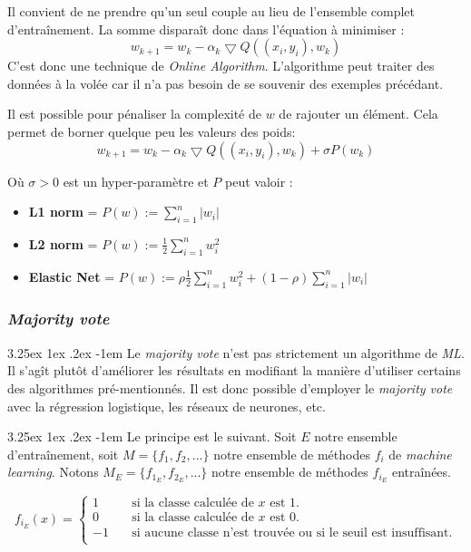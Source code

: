 \documentclass[a4paper, 11pt]{article}
\makeatletter
\renewcommand\paragraph{\@startsection{paragraph}{5}{\z@}%
  {3.25ex \@plus1ex \@minus.2ex}%
  {-1em}%
  {\normalfont\normalsize\bfseries}}
\makeatother
\begin{document}
Il convient de ne prendre qu'un seul couple au lieu de l'ensemble complet d'entraînement. La somme disparaît donc dans l'équation à minimiser :
$$w_{k+1} = w_k -\alpha_k \bigtriangledown Q ((x_i,y_i), w_k)$$
C'est donc une technique de \textit{Online Algorithm}. L'algorithme peut traiter des données à la volée car il n'a pas
besoin de se souvenir des exemples précédant.

Il est possible pour pénaliser la complexité de $w$ de rajouter un élément. Cela permet de borner quelque peu les valeurs des poids:
$$w_{k+1} = w_k -\alpha_k \bigtriangledown Q ((x_i,y_i), w_k) + \sigma P(w_k)$$

Où $\sigma > 0$ est un hyper-paramètre et $P$ peut valoir :
\begin{itemize}
\item \textbf{L1 norm} = $P(w) := \sum\limits_{i=1}^n |w_i|$
\item \textbf{L2 norm} = $P(w) := \frac{1}{2}\sum\limits_{i=1}^n w_i^2$
\item \textbf{Elastic Net} = $P(w) := \rho \frac{1}{2}\sum\limits_{i=1}^n w_i^2 + (1 - \rho) \sum\limits_{i=1}^n |w_i|$
\end{itemize}


\subsubsection{\textit{Majority vote}} \label{section majority vote}
\paragraph{}
Le \textit{majority vote} n'est pas strictement un algorithme de \textit{ML}. Il s'agît plutôt d'améliorer les résultats
en modifiant la manière d'utiliser certains des algorithmes pré-mentionnés.
Il est donc possible d'employer le \textit{majority vote} avec la régression logistique, les réseaux de neurones, etc.

\paragraph{}
Le principe est le suivant. Soit $E$ notre ensemble d'entraînement, soit $M = \{f_1, f_2, ...\}$ notre ensemble de
méthodes $f_i$ de \textit{machine learning}. Notons $M_E = \{f_{1_E}, f_{2_E}, ...\}$ notre ensemble de
méthodes $f_{i_E}$ entraînées.
 
\[ f_{i_E}(x) =
  \begin{cases}
    1       & \quad \text{si la classe calculée de $x$ est 1.}\\
    0  & \quad \text{si la classe calculée de $x$ est 0.}\\
    -1 & \quad \text{si aucune classe n'est trouvée ou si le seuil est insuffisant.}\\
  \end{cases}
\]
\end{document}
